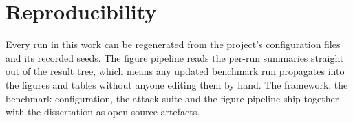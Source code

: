 \documentclass[11pt,a4paper,oneside]{report}
\begin{document}
\section{Reproducibility}

Every run in this work can be regenerated from the project's
configuration files and its recorded seeds. The figure pipeline reads
the per-run summaries straight out of the result tree, which means
any updated benchmark run propagates into the figures and tables
without anyone editing them by hand. The framework, the benchmark
configuration, the attack suite and the figure pipeline ship together
with the dissertation as open-source artefacts.

\end{document}

